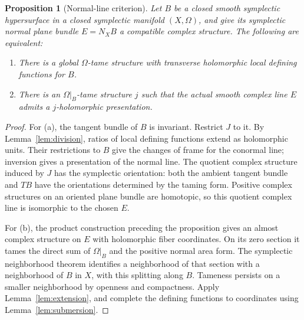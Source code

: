 \documentclass[11pt]{article}
\newtheorem{proposition}[theorem]{Proposition}
\theoremstyle{definition}
\theoremstyle{remark}
\begin{document}
\begin{proposition}[Normal-line criterion]\label{prop:normal}
Let $B$ be a closed smooth symplectic hypersurface in a closed symplectic manifold $(X,\Omega)$, and give its symplectic normal plane bundle $E=N_XB$ a compatible complex structure. The following are equivalent:
\begin{enumerate}[label=(\alph*),leftmargin=*]
\item There is a global $\Omega$-tame structure with transverse holomorphic local defining functions for $B$.
\item There is an $\Omega|_B$-tame structure $j$ such that the actual smooth complex line $E$ admits a $j$-holomorphic presentation.
\end{enumerate}
\end{proposition}
\begin{proof}
For (a), the tangent bundle of $B$ is invariant. 
Restrict $J$ to it. 
By Lemma~\ref{lem:division}, ratios of local defining functions extend as holomorphic units. Their restrictions to $B$ give the changes of frame for the conormal line; inversion gives a presentation of the normal line. The quotient complex structure induced by $J$ has the symplectic orientation: both the ambient tangent bundle and $TB$ have the orientations determined by the taming form. Positive complex structures on an oriented plane bundle are homotopic, so this quotient complex line is isomorphic to the chosen $E$.

For (b), the product construction preceding the proposition gives an almost complex structure on $E$ with holomorphic fiber coordinates. On its zero section it tames the direct sum of $\Omega|_B$ and the positive normal area form. The symplectic neighborhood theorem identifies a neighborhood of that section with a neighborhood of $B$ in $X$, with this splitting along $B$. Tameness persists on a smaller neighborhood by openness and compactness. Apply Lemma~\ref{lem:extension}, and complete the defining functions to coordinates using Lemma~\ref{lem:submersion}.
\end{proof}
\end{document}
